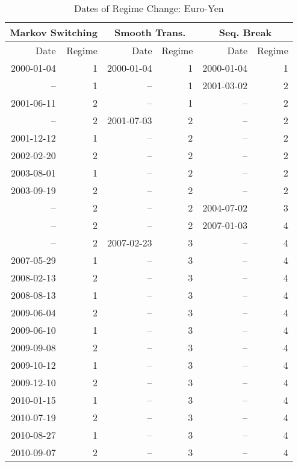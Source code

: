 \documentclass[12pt]{article}
\begin{document}
\begin{table}
	\centering
	\caption{Dates of Regime Change: Euro-Yen}
	\begin{tabular}[c]{r r | r r | r r}
		\midrule
		\multicolumn{2}{c}{Markov Switching} & \multicolumn{2}{c}{Smooth Trans.} & \multicolumn{2}{c}{Seq. Break} \\
		\midrule
		Date & Regime & Date & Regime & Date & Regime \\
		\midrule
		2000-01-04 &  1 & 2000-01-04 &  1 & 2000-01-04 &  1 \\
		        -- &  1 &         -- &  1 & 2001-03-02 &  2 \\
		2001-06-11 &  2 &         -- &  1 &         -- &  2 \\
		        -- &  2 & 2001-07-03 &  2 &         -- &  2 \\
		2001-12-12 &  1 &         -- &  2 &         -- &  2 \\
		2002-02-20 &  2 &         -- &  2 &         -- &  2 \\
		2003-08-01 &  1 &         -- &  2 &         -- &  2 \\
		2003-09-19 &  2 &         -- &  2 &         -- &  2 \\
		        -- &  2 &         -- &  2 & 2004-07-02 &  3 \\
				-- &  2 &         -- &  2 & 2007-01-03 &  4 \\
				-- &  2 & 2007-02-23 &  3 &         -- &  4 \\
		2007-05-29 &  1 &         -- &  3 &         -- &  4 \\
		2008-02-13 &  2 &         -- &  3 &         -- &  4 \\
		2008-08-13 &  1 &         -- &  3 &         -- &  4 \\
		2009-06-04 &  2 &         -- &  3 &         -- &  4 \\
		2009-06-10 &  1 &         -- &  3 &         -- &  4 \\
		2009-09-08 &  2 &         -- &  3 &         -- &  4 \\
		2009-10-12 &  1 &         -- &  3 &         -- &  4 \\
		2009-12-10 &  2 &         -- &  3 &         -- &  4 \\
		2010-01-15 &  1 &         -- &  3 &         -- &  4 \\
		2010-07-19 &  2 &         -- &  3 &         -- &  4 \\
		2010-08-27 &  1 &         -- &  3 &         -- &  4 \\
		2010-09-07 &  2 &         -- &  3 &         -- &  4 \\

\end{tabular}
\end{table}
\end{document}
